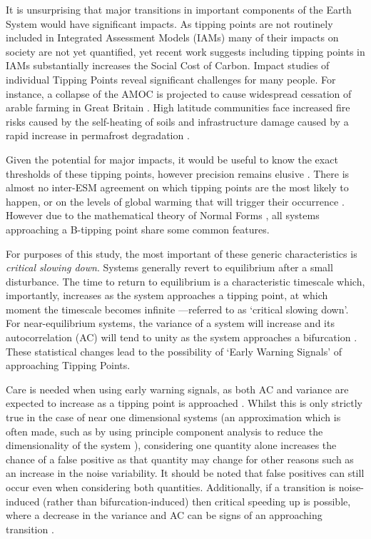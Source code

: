 It is unsurprising that major transitions in important components
of the Earth System would have significant impacts. As tipping points
are not routinely included in Integrated Assessment Models (IAMs) many of 
their impacts on society are not yet quantified, yet recent 
work \parencite{Dietz2021}
suggests including tipping points in IAMs
substantially increases the Social Cost 
of Carbon. Impact studies of individual 
Tipping Points reveal significant challenges for many people. For instance, a 
collapse of the AMOC is projected to cause
widespread cessation of arable farming in Great Britain \parencite{Ritchie2020a}.
High latitude communities face increased fire risks caused 
by the self-heating of soils \parencite{Clarke2021} and infrastructure damage 
caused by a rapid increase in permafrost degradation \parencite{Teufel2019}. 


Given the potential for major impacts, it would be useful to know the exact thresholds of
these tipping points, however precision remains elusive \parencite{Steffen2018}.
There is almost no inter-ESM
agreement on which tipping points are the most likely to happen, or on the
levels of global warming that will trigger their
occurrence \parencite{Drijfhout2015}.
However due to the mathematical theory of Normal 
Forms \parencite{Strogatz2015,guckenheimer2013}, all systems approaching a
B-tipping point share some common features.

For purposes of this study, the most important of these generic characteristics
is \emph{critical slowing down}. Systems generally revert to  equilibrium after a small disturbance. 
The time to return to equilibrium is a characteristic timescale which, importantly, increases as the system 
approaches a tipping point, at which moment the timescale becomes 
infinite \parencite{Scheffer2012}---referred to as `critical slowing down'. 
For near-equilibrium systems, the variance of a system will increase and its autocorrelation (AC)
will tend to unity as the system approaches a bifurcation \parencite{Scheffer2009,Held2004}.
These statistical changes lead to the possibility of `Early Warning Signals' of approaching Tipping Points.

Care is needed when using early warning signals, as
both AC and variance are expected to increase as a tipping point is 
approached \parencite{Ditlevsen2010}. Whilst this is only strictly true
in the case of near one dimensional systems (an approximation which is often made, such as by using principle component analysis to reduce the 
dimensionality of the system \parencite{Held2004}), considering one quantity alone 
increases the chance of a false positive as that quantity may change for other reasons such as an increase in the noise variability. It should 
be noted that false positives can still occur even when considering 
both quantities.
Additionally, if a transition is noise-induced (rather than bifurcation-induced) then critical speeding up is possible, where
a decrease in the variance and AC can be signs of an approaching transition \parencite{Titus2020}.

